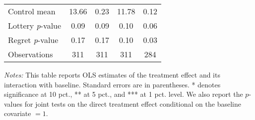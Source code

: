 \begin{table}[htbp]
{\begin{threeparttable}
\begin{tabular}{l*{4}{c}}
Control mean    &    13.66         &     0.23         &    11.78         &     0.12         \\
Lottery \emph{p}-value&     0.09         &     0.09         &     0.10         &     0.06         \\
Regret \emph{p}-value&     0.17         &     0.17         &     0.10         &     0.03         \\
Observations    &      311         &      311         &      311         &      284         \\
\bottomrule \end{tabular} \begin{tablenotes}[flushleft] \footnotesize \item \emph{Notes:} This table reports OLS estimates of the treatment effect and its interaction with baseline. Standard errors are in parentheses. * denotes significance at 10 pct., ** at 5 pct., and *** at 1 pct. level. We also report the \(p\)-values for joint tests on the direct treatment effect conditional on the baseline covariate $= 1$. \end{tablenotes} \end{threeparttable} } \end{table}

